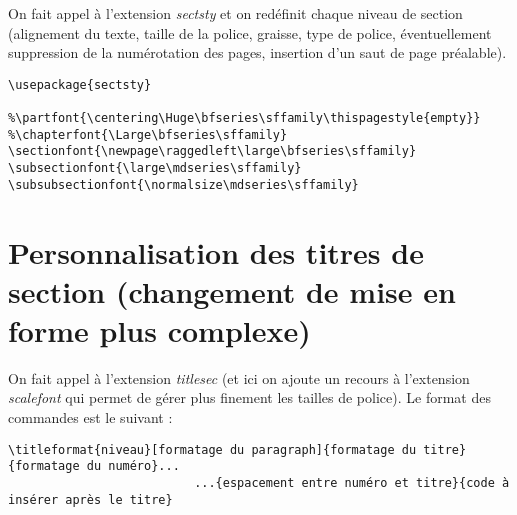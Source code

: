 On fait appel à l'extension \emph{sectsty} et on redéfinit chaque
niveau de section (alignement du texte, taille de la police, graisse,
type de police, éventuellement suppression de la numérotation des
pages, insertion d'un saut de page préalable).

{\small
\begin{verbatim}
\usepackage{sectsty}

%\partfont{\centering\Huge\bfseries\sffamily\thispagestyle{empty}}
%\chapterfont{\Large\bfseries\sffamily}
\sectionfont{\newpage\raggedleft\large\bfseries\sffamily}
\subsectionfont{\large\mdseries\sffamily}
\subsubsectionfont{\normalsize\mdseries\sffamily}
\end{verbatim}
}


\section{Personnalisation des titres de section (changement de mise en forme plus complexe)}

On fait appel à l'extension \emph{titlesec} (et ici on ajoute un
recours à l'extension \emph{scalefont} qui permet de gérer plus
finement les tailles de police). Le format des commandes est le suivant :

{\small
\begin{verbatim}
\titleformat{niveau}[formatage du paragraph]{formatage du titre}{formatage du numéro}...
                          ...{espacement entre numéro et titre}{code à insérer après le titre}
\end{verbatim}
}

